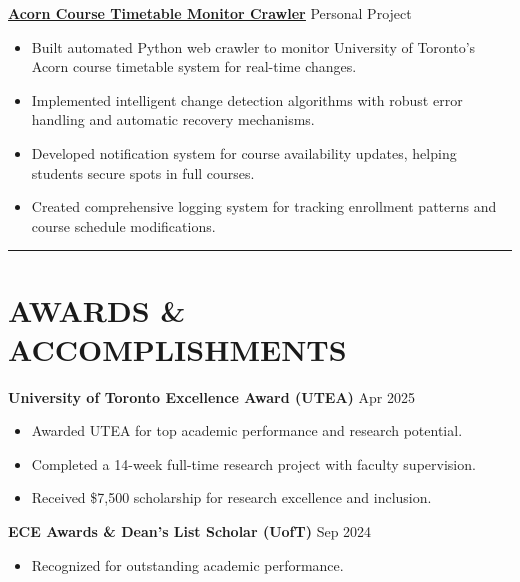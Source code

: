 \documentclass[a4paper,10pt]{article}
\begin{document}
\vspace{0.3cm}
\noindent\href{https://github.com/Ken-2511/AcornCarwler}{\uline{
\textbf{Acorn Course Timetable Monitor Crawler}}} \hfill Personal Project
\begin{itemize}[leftmargin=0.2in]
    \item Built automated Python web crawler to monitor University of Toronto's Acorn course timetable system for real-time changes.
    \item Implemented intelligent change detection algorithms with robust error handling and automatic recovery mechanisms.
    \item Developed notification system for course availability updates, helping students secure spots in full courses.
    \item Created comprehensive logging system for tracking enrollment patterns and course schedule modifications.
\end{itemize}

\noindent\rule{\linewidth}{1pt}

\section*{\textbf{AWARDS \& ACCOMPLISHMENTS}}

\noindent\textbf{University of Toronto Excellence Award (UTEA)} \hfill Apr 2025
\begin{itemize}[leftmargin=0.2in]
    \item Awarded UTEA for top academic performance and research potential.
    \item Completed a 14-week full-time research project with faculty supervision.
    \item Received \$7,500 scholarship for research excellence and inclusion.
\end{itemize}

\vspace{0.3cm}
\noindent\textbf{ECE Awards \& Dean's List Scholar (UofT)} \hfill Sep 2024
\begin{itemize}[leftmargin=0.2in]
    \item Recognized for outstanding academic performance.
\end{itemize}

\end{document}
